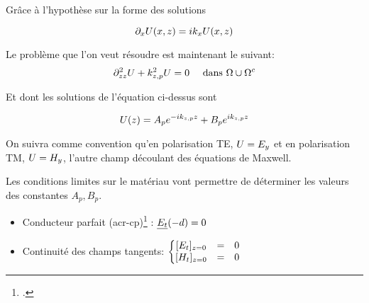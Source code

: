 






Grâce à l'hypothèse sur la forme des solutions

\[
\partial_{{x}} U({x},{z}) = ik_{x} U({x},{z})
\]

Le problème que l'on veut résoudre est maintenant le suivant:
\begin{equation}
\partial_{{z}{z}}^2 U + k_{{z},p}^2 U = 0 \quad \text { dans $\Omega\cup\Omega^c$}
\end{equation}

Et dont les solutions de l'équation ci-dessus sont

\[
\hfill U(\z) = A_p e^{-ik_{\z,p} \z}  + B_p e^{ik_{\z,p} \z}
\]

On suivra comme convention qu'en polarisation TE, $ U = E_{y}$ et en polarisation TM, $ U = H_{y}$, l'autre champ découlant des équations de Maxwell.


Les conditions limites sur le matériau vont permettre de déterminer les valeurs des constantes $A_p, B_p$.
\begin{itemize}
    \item 
    Conducteur parfait (\gls{acr-cp})\footcite[p.~217]{morse_methods_1953} : $\underline{E_t}(-d) = 0  $
    \item 
    Continuité des champs tangents: $
    \left\lbrace 
    \begin{matrix}
    [ E_t]_{{z}=0} &=& 0 \\
    [ H_t]_{{z}=0} &=& 0 
    \end{matrix}
    \right.$
\end{itemize}

